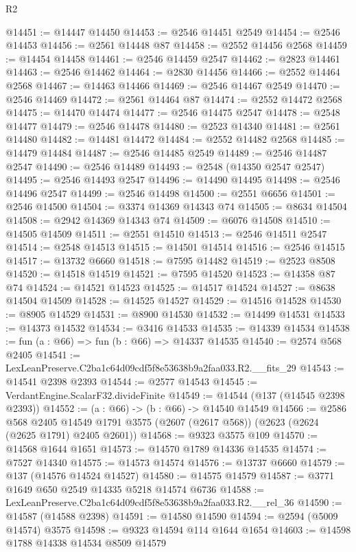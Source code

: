 \begin{lexlean}{R2}
\begin{coremodule}
@14451 := @14447 @14450
@14453 := @2546 @14451 @2549
@14454 := @2546 @14453
@14456 := @2561 @14448 @87
@14458 := @2552 @14456 @2568
@14459 := @14454 @14458
@14461 := @2546 @14459 @2547
@14462 := @2823 @14461
@14463 := @2546 @14462
@14464 := @2830 @14456
@14466 := @2552 @14464 @2568
@14467 := @14463 @14466
@14469 := @2546 @14467 @2549
@14470 := @2546 @14469
@14472 := @2561 @14464 @87
@14474 := @2552 @14472 @2568
@14475 := @14470 @14474
@14477 := @2546 @14475 @2547
@14478 := @2548 @14477
@14479 := @2546 @14478
@14480 := @2523 @14340
@14481 := @2561 @14480
@14482 := @14481 @14472
@14484 := @2552 @14482 @2568
@14485 := @14479 @14484
@14487 := @2546 @14485 @2549
@14489 := @2546 @14487 @2547
@14490 := @2546 @14489
@14493 := @2548 (@14350 @2547 @2547)
@14495 := @2546 @14493 @2547
@14496 := @14490 @14495
@14498 := @2546 @14496 @2547
@14499 := @2546 @14498
@14500 := @2551 @6656
@14501 := @2546 @14500
@14504 := @3374 @14369 @14343 @74
@14505 := @8634 @14504
@14508 := @2942 @14369 @14343 @74
@14509 := @6076 @14508
@14510 := @14505 @14509
@14511 := @2551 @14510
@14513 := @2546 @14511 @2547
@14514 := @2548 @14513
@14515 := @14501 @14514
@14516 := @2546 @14515
@14517 := @13732 @6660
@14518 := @7595 @14482
@14519 := @2523 @8508
@14520 := @14518 @14519
@14521 := @7595 @14520
@14523 := @14358 @87 @74
@14524 := @14521 @14523
@14525 := @14517 @14524
@14527 := @8638 @14504 @14509
@14528 := @14525 @14527
@14529 := @14516 @14528
@14530 := @8905 @14529
@14531 := @8900 @14530
@14532 := @14499 @14531
@14533 := @14373 @14532
@14534 := @3416 @14533
@14535 := @14339 @14534
@14538 := fun (a : @66) => fun (b : @66) => @14337 @14535
@14540 := @2574 @568 @2405
@14541 := LexLeanPreserve.C2ba1c64d09cdf5f8e53638b9a2faa033.R2.__fits_29
@14543 := @14541 @2398 @2393
@14544 := @2577 @14543
@14545 := VerdantEngine.ScalarF32.divideFinite
@14549 := @14544 (@137 (@14545 @2398 @2393))
@14552 := (a : @66) -> (b : @66) -> @14540 @14549
@14566 := @2586
    @568
    @2405
    @14549
    @1791
    @3575
    (@2607 (@2617 @568))
    (@2623 (@2624 (@2625 @1791) @2405 @2601))
@14568 := @9323 @3575 @109
@14570 := @14568 @1644 @1651
@14573 := @14570 @1789 @14336 @14535
@14574 := @7527 @14340
@14575 := @14573 @14574
@14576 := @13737 @6660
@14579 := @137 (@14576 @14524 @14527)
@14580 := @14575 @14579
@14587 := @3771 @1649 @650 @2549 @14335 @5218 @14574 @6736
@14588 := LexLeanPreserve.C2ba1c64d09cdf5f8e53638b9a2faa033.R2.__rel_36
@14590 := @14587 (@14588 @2398)
@14591 := @14580 @14590
@14594 := @2594 (@5009 @14574) @3575
@14598 := @9323 @14594 @114 @1644 @1654
@14603 := @14598 @1788 @14338 @14534 @8509 @14579

\end{coremodule}
\end{lexlean}
